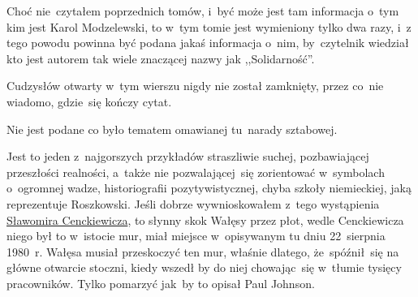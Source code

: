 \documentclass[a4paper,11pt]{article}
\begin{document}
\vspace{\spaceFour}


\start {} Choć nie~czytałem poprzednich tomów, i~być może jest
tam informacja o~tym kim jest Karol Modzelewski, to w~tym tomie jest
wymieniony tylko dwa razy, i~z tego powodu powinna być podana jakaś
informacja o~nim, by~czytelnik wiedział kto jest autorem tak wiele
znaczącej nazwy jak ,,Solidarność''.

\vspace{\spaceFour}


\start {} Cudzysłów otwarty w~tym wierszu nigdy nie został
zamknięty, przez co~nie wiadomo, gdzie~się kończy cytat.

\vspace{\spaceFour}


\start {} Nie jest podane co było tematem omawianej
tu~narady sztabowej.



\vspace{\spaceTwo}








\start {} Jest to jeden z~najgorszych przykładów straszliwie
suchej, pozbawiającej przeszłości realności, a~także nie
pozwalającej~się zorientować w~symbolach o~ogromnej wadze,
historiografii pozytywistycznej, chyba szkoły niemieckiej, jaką
reprezentuje Roszkowski. Jeśli dobrze wywnioskowałem z~tego
wystąpienia
\href{https://www.youtube.com/watch?v=6B93_3CCMac}{Sławomira
  Cenckiewicza}, to słynny skok Wałęsy przez płot, wedle Cenckiewicza
niego był to w~istocie mur, miał miejsce w~opisywanym tu dniu
22~sierpnia 1980~r. Wałęsa musiał przeskoczyć ten mur, właśnie
dlatego, że~spóźnił~się na główne otwarcie stoczni, kiedy wszedł by do
niej chowając~się w~tłumie tysięcy pracowników. Tylko pomarzyć jak~by
to opisał Paul Johnson.
\end{document}
